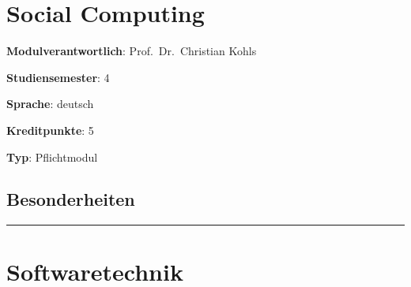 \hypertarget{social-computingpathlabel....srcmodulbeschreibungen-bachelor-bpo5ba_social-computing}{%
\chapter{Social
Computing\label{../../src/modulbeschreibungen-bachelor-bpo5/BA_Social-Computing}}\label{social-computingpathlabel....srcmodulbeschreibungen-bachelor-bpo5ba_social-computing}}

\begin{modulHead}
\textbf{Modulverantwortlich}: Prof.~Dr.~Christian
Kohls
\end{modulHead}
\begin{modulHead}
\textbf{Studiensemester}:
4
\end{modulHead}
\begin{modulHead}
\textbf{Sprache}:
deutsch
\end{modulHead}
\begin{modulHead}
\textbf{Kreditpunkte}:
5
\end{modulHead}
\begin{modulHead}
\textbf{Typ}:
Pflichtmodul
\end{modulHead}


\hypertarget{besonderheitenpathlabel....srcmodulbeschreibungen-bachelor-bpo5ba_social-computing}{%
\section*{Besonderheiten\label{../../src/modulbeschreibungen-bachelor-bpo5/BA_Social-Computing}}\label{besonderheitenpathlabel....srcmodulbeschreibungen-bachelor-bpo5ba_social-computing}}

\begin{center}\rule{0.5\linewidth}{0.5pt}\end{center}

\hypertarget{softwaretechnikpathlabel....srcmodulbeschreibungen-bachelor-bpo5ba_softwaretechnik}{%
\chapter{Softwaretechnik\label{../../src/modulbeschreibungen-bachelor-bpo5/BA_Softwaretechnik}}\label{softwaretechnikpathlabel....srcmodulbeschreibungen-bachelor-bpo5ba_softwaretechnik}}

